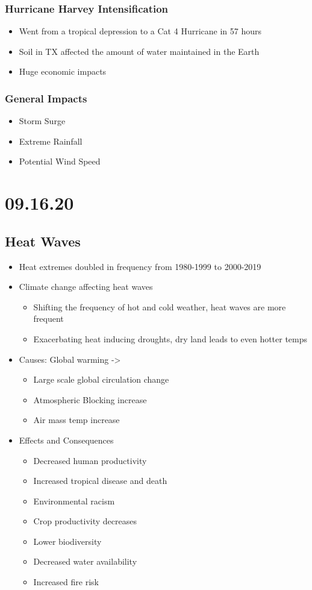 \documentclass[11pt]{article}
\begin{document}
\subsubsection{Hurricane Harvey Intensification}
\label{sec:org966f862}
\begin{itemize}
\item Went from a tropical depression to a Cat 4 Hurricane in 57 hours
\item Soil in TX affected the amount of water maintained in the Earth
\item Huge economic impacts
\end{itemize}
\subsubsection{General Impacts}
\label{sec:orga387d2b}
\begin{itemize}
\item Storm Surge
\item Extreme Rainfall
\item Potential Wind Speed
\end{itemize}
\section{09.16.20}
\label{sec:org21cc43a}
\subsection{Heat Waves}
\label{sec:orgca3ce99}
\begin{itemize}
\item Heat extremes doubled in frequency from 1980-1999 to 2000-2019
\item Climate change affecting heat waves
\begin{itemize}
\item Shifting the frequency of hot and cold weather, heat waves are more frequent
\item Exacerbating heat inducing droughts, dry land leads to even hotter temps
\end{itemize}
\item Causes: Global warming ->
\begin{itemize}
\item Large scale global circulation change
\item Atmospheric Blocking increase
\item Air mass temp increase
\end{itemize}
\item Effects and Consequences
\begin{itemize}
\item Decreased human productivity
\item Increased tropical disease and death
\item Environmental racism
\item Crop productivity decreases
\item Lower biodiversity
\item Decreased water availability
\item Increased fire risk
\end{itemize}
\end{itemize}
\end{document}

